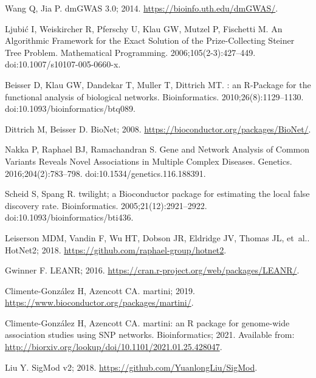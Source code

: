 \documentclass[10pt,letterpaper]{article}
\begin{document}
\begin{thebibliography}{10}
  Wang Q, Jia P. dmGWAS 3.0; 2014.
  \newblock \url{https://bioinfo.uth.edu/dmGWAS/}.
  
  Ljubić I, Weiskircher R, Pferschy U, Klau GW, Mutzel P, Fischetti M.
  \newblock An {Algorithmic} {Framework} for the {Exact} {Solution} of the
    {Prize}-{Collecting} {Steiner} {Tree} {Problem}.
  \newblock Mathematical Programming. 2006;105(2-3):427--449.
  \newblock doi:{10.1007/s10107-005-0660-x}.
  
  Beisser D, Klau GW, Dandekar T, Muller T, Dittrich MT.
  : an {R}-{Package} for the functional analysis of biological
    networks.
  \newblock Bioinformatics. 2010;26(8):1129--1130.
  \newblock doi:{10.1093/bioinformatics/btq089}.
  
  Dittrich M, Beisser D. BioNet; 2008.
  \newblock \url{https://bioconductor.org/packages/BioNet/}.
  
  Nakka P, Raphael BJ, Ramachandran S.
  \newblock Gene and {Network} {Analysis} of {Common} {Variants} {Reveals}
    {Novel} {Associations} in {Multiple} {Complex} {Diseases}.
  \newblock Genetics. 2016;204(2):783--798.
  \newblock doi:{10.1534/genetics.116.188391}.
  
  Scheid S, Spang R.
  \newblock twilight; a {Bioconductor} package for estimating the local false
    discovery rate.
  \newblock Bioinformatics. 2005;21(12):2921--2922.
  \newblock doi:{10.1093/bioinformatics/bti436}.
  
  Leiserson MDM, Vandin F, Wu HT, Dobson JR, Eldridge JV, Thomas JL, et~al..
    HotNet2; 2018.
  \newblock \url{https://github.com/raphael-group/hotnet2}.
  
  Gwinner F. LEANR; 2016.
  \newblock \url{https://cran.r-project.org/web/packages/LEANR/}.
  
  Climente-González H, Azencott CA. martini; 2019.
  \newblock \url{https://www.bioconductor.org/packages/martini/}.
  
  Climente-González H, Azencott CA.
  \newblock martini: an {R} package for genome-wide association studies using
    {SNP} networks.
  \newblock Bioinformatics; 2021.
  \newblock Available from:
    \url{http://biorxiv.org/lookup/doi/10.1101/2021.01.25.428047}.
  
  Liu Y. SigMod v2; 2018.
  \newblock \url{https://github.com/YuanlongLiu/SigMod}.
  

\end{thebibliography}
\end{document}
